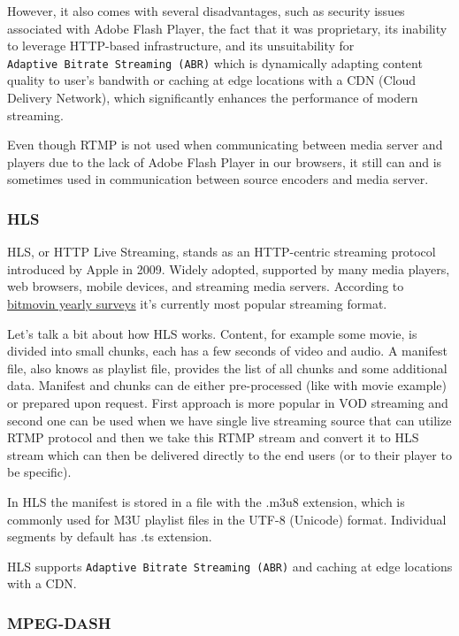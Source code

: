 \documentclass{article}
\begin{document}
However, it also comes with several disadvantages, such as security
issues associated with Adobe Flash Player, the fact that it was
proprietary, its inability to leverage HTTP-based infrastructure, and
its unsuitability for \texttt{Adaptive\ Bitrate\ Streaming\ (ABR)} which
is dynamically adapting content quality to user's bandwith or caching at
edge locations with a CDN (Cloud Delivery Network), which significantly
enhances the performance of modern streaming.

Even though RTMP is not used when communicating between media server and
players due to the lack of Adobe Flash Player in our browsers, it still
can and is sometimes used in communication between source encoders and
media server.

\subsubsection{HLS}\label{hls}

HLS, or HTTP Live Streaming, stands as an HTTP-centric streaming
protocol introduced by Apple in 2009. Widely adopted, supported by many
media players, web browsers, mobile devices, and streaming media
servers. According to
\href{https://bitmovin.com/wp-content/uploads/2022/12/bitmovin-6th-video-developer-report-2022-2023.pdf}{bitmovin
yearly surveys} it's currently most popular streaming format.

Let's talk a bit about how HLS works. Content, for example some movie,
is divided into small chunks, each has a few seconds of video and audio.
A manifest file, also knows as playlist file, provides the list of all
chunks and some additional data. Manifest and chunks can de either
pre-processed (like with movie example) or prepared upon request. First
approach is more popular in VOD streaming and second one can be used
when we have single live streaming source that can utilize RTMP protocol
and then we take this RTMP stream and convert it to HLS stream which can
then be delivered directly to the end users (or to their player to be
specific).

In HLS the manifest is stored in a file with the .m3u8 extension, which
is commonly used for M3U playlist files in the UTF-8 (Unicode) format.
Individual segments by default has .ts extension.

HLS supports \texttt{Adaptive\ Bitrate\ Streaming\ (ABR)} and caching at
edge locations with a CDN.

\subsubsection{MPEG-DASH}\label{mpeg-dash}
\end{document}

